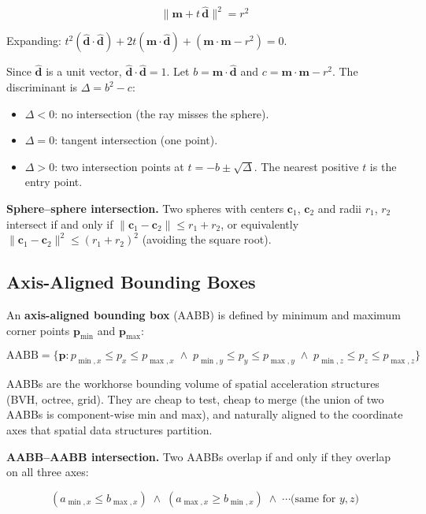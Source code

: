 \documentclass[
  11pt,
  letterpaper,
  DIV=11,
  numbers=noendperiod,
  twoside,
  open=right]{scrreprt}
\providecommand{\tightlist}{%
  \setlength{\itemsep}{0pt}\setlength{\parskip}{0pt}}
\begin{document}
\[
\|\mathbf{m} + t \, \hat{\mathbf{d}}\|^2 = r^2
\]

Expanding:
\(t^2 (\hat{\mathbf{d}} \cdot \hat{\mathbf{d}}) + 2t (\mathbf{m} \cdot \hat{\mathbf{d}}) + (\mathbf{m} \cdot \mathbf{m} - r^2) = 0\).

Since \(\hat{\mathbf{d}}\) is a unit vector,
\(\hat{\mathbf{d}} \cdot \hat{\mathbf{d}} = 1\). Let
\(b = \mathbf{m} \cdot \hat{\mathbf{d}}\) and
\(c = \mathbf{m} \cdot \mathbf{m} - r^2\). The discriminant is
\(\Delta = b^2 - c\):

\begin{itemize}
\tightlist
\item
  \(\Delta < 0\): no intersection (the ray misses the sphere).
\item
  \(\Delta = 0\): tangent intersection (one point).
\item
  \(\Delta > 0\): two intersection points at
  \(t = -b \pm \sqrt{\Delta}\). The nearest positive \(t\) is the entry
  point.
\end{itemize}

\textbf{Sphere--sphere intersection.} Two spheres with centers
\(\mathbf{c}_1\), \(\mathbf{c}_2\) and radii \(r_1\), \(r_2\) intersect
if and only if \(\|\mathbf{c}_1 - \mathbf{c}_2\| \leq r_1 + r_2\), or
equivalently \(\|\mathbf{c}_1 - \mathbf{c}_2\|^2 \leq (r_1 + r_2)^2\)
(avoiding the square root).

\subsection{Axis-Aligned Bounding
Boxes}\label{axis-aligned-bounding-boxes}

An \textbf{axis-aligned bounding box} (AABB) is defined by minimum and
maximum corner points \(\mathbf{p}_{\min}\) and \(\mathbf{p}_{\max}\):

\[
\text{AABB} = \{ \mathbf{p} : p_{\min,x} \leq p_x \leq p_{\max,x} \;\land\; p_{\min,y} \leq p_y \leq p_{\max,y} \;\land\; p_{\min,z} \leq p_z \leq p_{\max,z} \}
\]

AABBs are the workhorse bounding volume of spatial acceleration
structures (BVH, octree, grid). They are cheap to test, cheap to merge
(the union of two AABBs is component-wise min and max), and naturally
aligned to the coordinate axes that spatial data structures partition.

\textbf{AABB--AABB intersection.} Two AABBs overlap if and only if they
overlap on all three axes:

\[
(a_{\min,x} \leq b_{\max,x}) \;\land\; (a_{\max,x} \geq b_{\min,x}) \;\land\; \cdots \text{(same for } y, z \text{)}
\]
\end{document}

